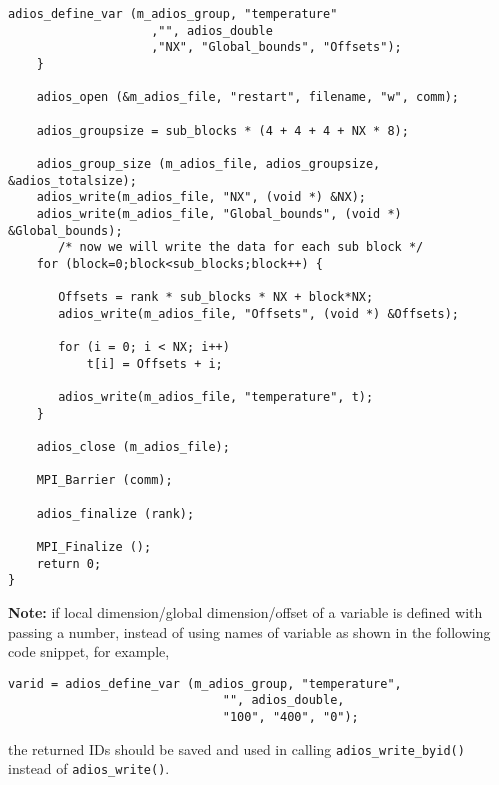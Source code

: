 \begin{lstlisting}[alsolanguage=C]
       adios_define_var (m_adios_group, "temperature"
                    ,"", adios_double
                    ,"NX", "Global_bounds", "Offsets");
    }

    adios_open (&m_adios_file, "restart", filename, "w", comm);

    adios_groupsize = sub_blocks * (4 + 4 + 4 + NX * 8);

    adios_group_size (m_adios_file, adios_groupsize, &adios_totalsize);
    adios_write(m_adios_file, "NX", (void *) &NX);
    adios_write(m_adios_file, "Global_bounds", (void *) &Global_bounds);
       /* now we will write the data for each sub block */
    for (block=0;block<sub_blocks;block++) {

       Offsets = rank * sub_blocks * NX + block*NX;
       adios_write(m_adios_file, "Offsets", (void *) &Offsets);

       for (i = 0; i < NX; i++)
           t[i] = Offsets + i;

       adios_write(m_adios_file, "temperature", t);
    }

    adios_close (m_adios_file);

    MPI_Barrier (comm);

    adios_finalize (rank);

    MPI_Finalize ();
    return 0;
}

\end{lstlisting}


\noindent \textbf{Note:} if local dimension/global 
dimension/offset of a variable is defined with passing a number, instead of using 
names of variable as shown in the following code snippet, for example,

\begin{lstlisting}[alsolanguage=C]
    varid = adios_define_var (m_adios_group, "temperature",
                              "", adios_double,
                              "100", "400", "0");
\end{lstlisting}

\noindent the returned IDs should be saved and used in calling \verb+adios_write_byid()+ instead of \verb+adios_write()+.

